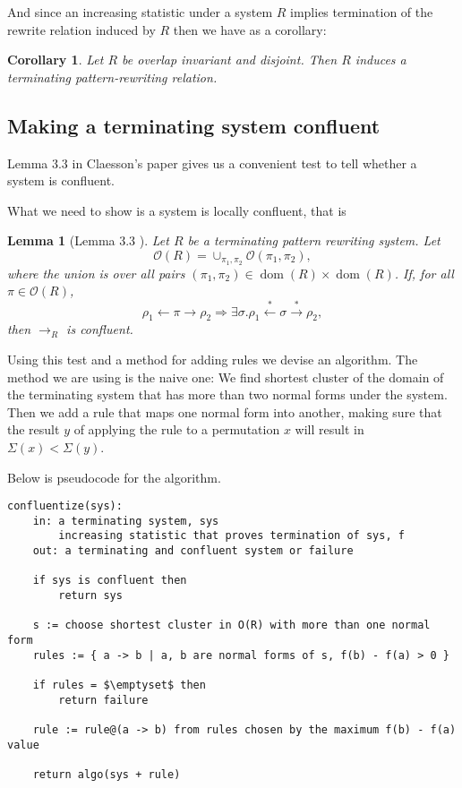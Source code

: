 \documentclass[a4paper, 11pt, english]{article}
\newtheorem{lemma}[theorem]{Lemma}
\newtheorem{corollary}[theorem]{Corollary}
\theoremstyle{definition}
\newcommand{\Ocal}{\mathcal{O}}
\newcommand{\from}{\leftarrow}
\newcommand{\tostar}{\stackrel{*}{\to}}
\newcommand{\fromstar}{\stackrel{*}{\from}}
\DeclareMathOperator{\dom}{dom}
\begin{document}
And since an increasing statistic under a system $R$ implies termination of the rewrite relation
induced by $R$ then we have as a corollary:

\begin{corollary}
    Let $R$ be overlap invariant and disjoint. Then $R$ induces a terminating pattern-rewriting relation.
\end{corollary}

\subsection{Making a terminating system confluent}
Lemma $3.3$ in Claesson's paper gives us a convenient test to tell whether a system is
confluent. 

What we need to show is a system is locally confluent, that is
\begin{lemma}[Lemma 3.3 \cite{claesson:2021}]
    Let $R$ be a terminating pattern rewriting system. Let 
    \begin{equation*}
        \Ocal(R) = \cup_{\pi_1, \pi_2} \Ocal(\pi_1, \pi_2),
    \end{equation*}
    where the union is over all pairs $(\pi_1, \pi_2) \in \dom(R) \times \dom(R)$. If, for all
    $\pi \in \Ocal(R)$,
    \begin{equation*}
        \rho_1 \from \pi \to \rho_2 \Longrightarrow \exists \sigma. \rho_1 \fromstar \sigma \tostar
        \rho_2,
    \end{equation*}
    then $\to_R$ is confluent.
        
\end{lemma}

Using this test and a method for adding rules we devise an algorithm. The method we are using is the
naive one: We find shortest cluster of the domain of the terminating system that has more than two
normal forms under the system. Then we add a rule that maps one normal form into another, making
sure that the result $y$ of applying the rule to a permutation $x$ will result in $\Sigma(x) <
\Sigma(y)$.

Below is pseudocode for the algorithm.

\lstset{basicstyle=\footnotesize\ttfamily, frame=single, breaklines=true,
mathescape=true}
\begin{minipage}{\linewidth}
\begin{lstlisting}[title={Algorithm 1}]
confluentize(sys):
    in: a terminating system, sys
        increasing statistic that proves termination of sys, f
    out: a terminating and confluent system or failure

    if sys is confluent then
        return sys

    s := choose shortest cluster in O(R) with more than one normal form
    rules := { a -> b | a, b are normal forms of s, f(b) - f(a) > 0 }

    if rules = $\emptyset$ then
        return failure

    rule := rule@(a -> b) from rules chosen by the maximum f(b) - f(a) value

    return algo(sys + rule)
\end{lstlisting}
\end{minipage}
\end{document}

